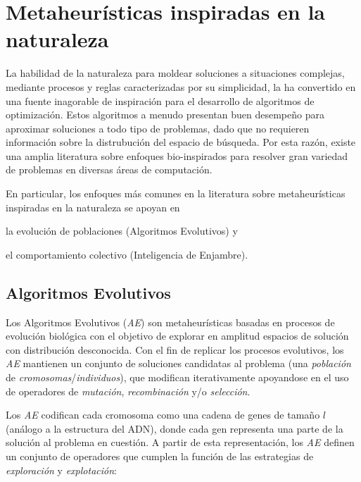 \section{Metaheurísticas inspiradas en la naturaleza}

La habilidad de la naturaleza para moldear soluciones a situaciones complejas, mediante procesos y reglas caracterizadas por su simplicidad, la ha convertido en una fuente inagorable de inspiración para el desarrollo de algoritmos de optimización. Estos algoritmos a menudo presentan buen desempeño para aproximar soluciones a todo tipo de problemas, dado que no requieren información sobre la distrubución del espacio de búsqueda. Por esta razón, existe una amplia literatura sobre enfoques bio-inspirados \cite{binitha2012survey} para resolver gran variedad de problemas en diversas áreas de computación.

En particular, los enfoques más comunes en la literatura sobre metaheurísticas inspiradas en la naturaleza se apoyan en
\begin{inparaenum}
\item la evolución de poblaciones (Algoritmos Evolutivos) y
\item el comportamiento colectivo (Inteligencia de Enjambre).
\end{inparaenum}

\subsection{Algoritmos Evolutivos}

Los Algoritmos Evolutivos (\emph{AE}) son metaheurísticas basadas en procesos de evolución biológica con el objetivo de explorar en amplitud espacios de solución con distribución desconocida. Con el fin de replicar los procesos evolutivos, los \emph{AE} mantienen un conjunto de soluciones candidatas al problema (una \emph{población} de \emph{cromosomas}/\emph{individuos}), que modifican iterativamente apoyandose en el uso de operadores de \emph{mutación}, \emph{recombinación} y/o \emph{selección}.

Los \emph{AE} codifican cada cromosoma como una cadena de genes de tamaño $l$ (análogo a la estructura del ADN), donde cada gen representa una parte de la solución al problema en cuestión. A partir de esta representación, los \emph{AE} definen un conjunto de operadores que cumplen la función de las estrategias de \emph{exploración} y \emph{explotación}:

